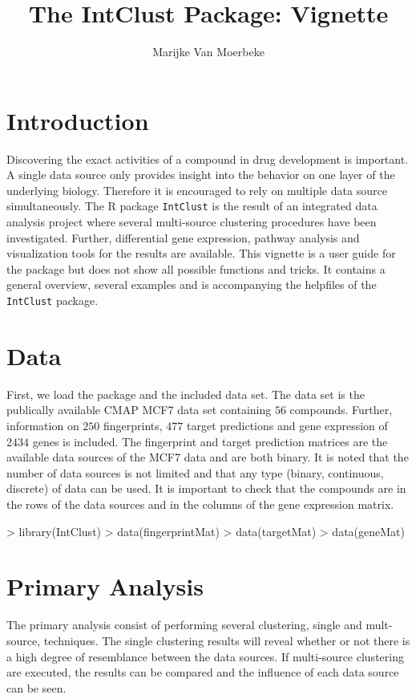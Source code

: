 \documentclass[a4paper]{article}
\title{The IntClust Package: Vignette}
\author{Marijke Van Moerbeke}
\begin{document}
\maketitle
\tableofcontents
\pagebreak{}


\section{Introduction}
Discovering the exact activities of a compound in drug development is important.
A single data source only provides insight into the behavior on one layer of the
underlying biology. Therefore it is encouraged to rely on multiple data source
simultaneously. The R package \texttt{IntClust} is the result of an integrated
data analysis project where several multi-source clustering procedures have been
investigated. Further, differential gene expression, pathway analysis and
visualization tools for the results are available. This vignette is a user guide
for the package but does not show all possible functions and tricks. It
contains a general overview, several examples and is accompanying the
helpfiles of the \texttt{IntClust} package.
\section{Data}
First, we load the package and the included data set. The data set is the
publically available CMAP MCF7 data set containing $56$ compounds. Further,
information on $250$ fingerprints, $477$ target predictions and gene
expression of $2434$ genes is included. The fingerprint and target prediction
matrices are the available data sources of the MCF7 data and are both binary. It
is noted that the number of data sources is not limited and that any type
(binary, continuous, discrete) of data can be used. It is important to check
that the compounds are in the rows of the data sources and in the columns of
the gene expression matrix.

\begin{Schunk}
\begin{Sinput}
> library(IntClust)
> data(fingerprintMat)
> data(targetMat)
> data(geneMat)
\end{Sinput}
\end{Schunk}
\section{Primary Analysis}
The primary analysis consist of performing several clustering, single and
mult-source, techniques. The single clustering results will reveal whether or
not there is a high degree of resemblance between the data sources. If
multi-source clustering are executed, the results can be compared and the
influence of each data source can be seen. 
\end{document}
